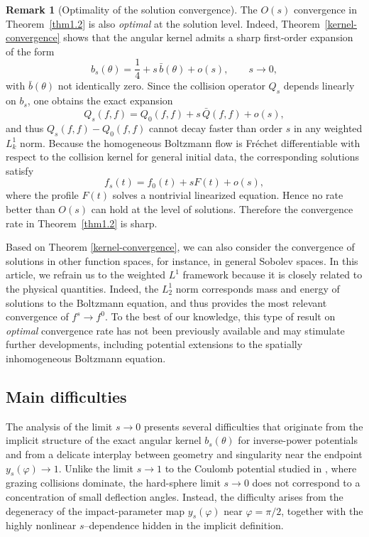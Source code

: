 \documentclass[reqno,10pt]{amsart}
\theoremstyle{definition}
\newtheorem{rmk}{Remark}[section]
\numberwithin{equation}{section}
\begin{document}
\begin{rmk}[Optimality of the solution convergence]\label{optimality-solution}
The $O(s)$ convergence in Theorem~\ref{thm1.2} is also \textit{optimal} at the solution level.  
Indeed, Theorem~\ref{kernel-convergence} shows that the angular kernel admits a sharp
first-order expansion of the form
\[
b_s(\theta)=\frac14 + s\,\bar{b}(\theta) + o(s),
\qquad s\to0,
\]
with $\bar{b}(\theta)$ not identically zero.  
Since the collision operator $Q_s$ depends linearly on $b_s$, one obtains the exact expansion
\[
Q_s(f,f)=Q_0(f,f)+s\,\bar{Q}(f,f)+o(s),
\]
and thus $Q_s(f,f)-Q_0(f,f)$ cannot decay faster than order $s$ in any weighted $L^1_k$ norm.
Because the homogeneous Boltzmann flow is Fréchet differentiable with respect to the collision
kernel for general initial data, the corresponding solutions satisfy
\[
f_s(t)=f_0(t)+sF(t)+o(s),
\]
where the profile $F(t)$ solves a nontrivial linearized equation.
Hence no rate better than $O(s)$ can hold at the level of solutions.
Therefore the convergence rate in Theorem~\ref{thm1.2} is sharp.
\end{rmk}





Based on Theorem \ref{kernel-convergence},
we can also consider the convergence of solutions in other function spaces, for instance, in general Sobolev spaces. In this article, we refrain us to the weighted $L^1$ framework because it is closely related to the physical quantities. 
Indeed, the $L^1_2$ norm corresponds mass and energy of solutions to the Boltzmann equation, and thus provides the most relevant convergence of $f^s\to f^0$.
To the best of our knowledge, this type of result on \textit{optimal} convergence rate has not been previously available and may stimulate further developments, including potential extensions to the spatially inhomogeneous Boltzmann equation.

\subsection{Main difficulties}

The analysis of the limit $s\to0$ presents several difficulties that originate
from the implicit structure of the exact angular kernel $b_s(\theta)$ for inverse-power potentials and from a delicate interplay between geometry and singularity near the endpoint $y_s(\varphi)\to1$. 
Unlike the limit $s\to 1$ to the Coulomb potential studied in \cite{yang2025boltzmann}, where grazing collisions dominate, the hard-sphere limit $s\to0$ does not correspond to a concentration of small deflection angles. 
Instead, the difficulty arises from the degeneracy of the impact-parameter map $y_s(\varphi)$ near $\varphi=\pi/2$, together with the highly nonlinear $s$--dependence hidden in the implicit definition.
\end{document}
